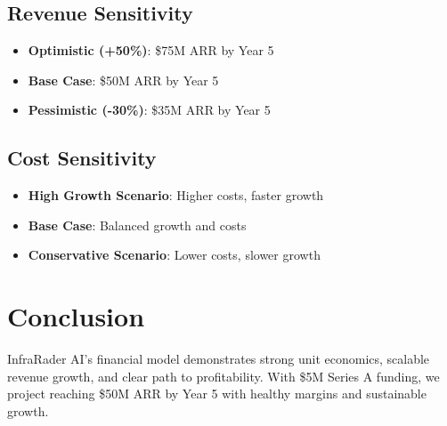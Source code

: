 \documentclass[business]{../templates/infraradar-main}
\begin{document}
\subsection{Revenue Sensitivity}
\begin{itemize}
    \item \textbf{Optimistic (+50\%)}: \$75M ARR by Year 5
    \item \textbf{Base Case}: \$50M ARR by Year 5
    \item \textbf{Pessimistic (-30\%)}: \$35M ARR by Year 5
\end{itemize}

\subsection{Cost Sensitivity}
\begin{itemize}
    \item \textbf{High Growth Scenario}: Higher costs, faster growth
    \item \textbf{Base Case}: Balanced growth and costs
    \item \textbf{Conservative Scenario}: Lower costs, slower growth
\end{itemize}

\section{Conclusion}

InfraRader AI's financial model demonstrates strong unit economics, scalable revenue growth, and clear path to profitability. With \$5M Series A funding, we project reaching \$50M ARR by Year 5 with healthy margins and sustainable growth.
\end{document}
